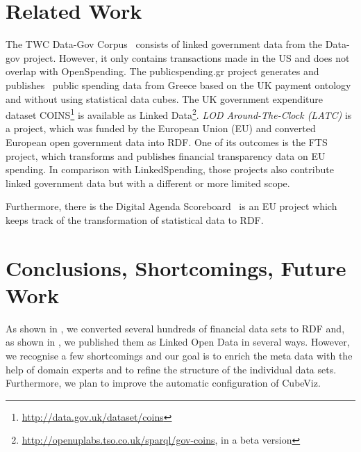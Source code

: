 \documentclass[sw]{iosart2x}
\begin{document}
\section{Related Work}\label{sec:relatedwork}
The TWC Data-Gov Corpus~\cite{datagov1,datagov2} consists of linked government data from the Data-gov project. However, it only contains transactions made in the US and does not overlap with OpenSpending.
The publicspending.gr project generates and publishes~\cite{spendinggreece} public spending data from Greece based on the UK payment ontology and without using statistical data cubes.
The UK government expenditure dataset COINS\footnote{\url{http://data.gov.uk/dataset/coins}} is available as Linked Data\footnote{\url{http://openuplabs.tso.co.uk/sparql/gov-coins}, in a beta version}.
\emph{LOD Around-The-Clock (LATC)} is a project, which was funded by the European Union (EU) and converted European open government data into RDF.
One of its outcomes is the FTS~\cite{martin-fts} project, which transforms and publishes financial transparency data on EU spending.
In comparison with LinkedSpending, those projects also contribute linked government data but with a different or more limited scope.

Furthermore, there is the Digital Agenda Scoreboard~\cite{martin-scoreboard} is an EU project which keeps track of the transformation of statistical data to RDF. 

\section{Conclusions, Shortcomings, Future Work}\label{sec:conclusions}
As shown in , we converted several hundreds of financial data sets to RDF and, as shown in , we published them as Linked Open Data in several ways.
However, we recognise a few shortcomings and our goal is to enrich the meta data with the help of domain experts and to refine the structure of the individual data sets.
Furthermore, we plan to improve the automatic configuration of CubeViz.
\end{document}
